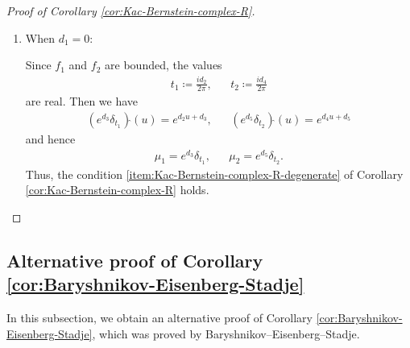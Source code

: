 \documentclass[12pt]{article}
\theoremstyle{definition}
\theoremstyle{remark}
\numberwithin{equation}{section}
\numberwithin{figure}{section}
\numberwithin{table}{section}
\begin{document}
\begin{proof}[Proof of Corollary \ref{cor:Kac-Bernstein-complex-R}]
\begin{enumerate}[label=(Case \arabic*)]
\item
When $ d_1 = 0 $:

Since $ f_1 $ and $ f_2 $ are bounded, the values
\begin{align}
    t_1 \coloneqq \frac{ i d_2 }{ 2 \pi }, & &
    t_2 \coloneqq \frac{ i d_4 }{ 2 \pi }
\end{align}
are real.
Then we have
\begin{align}
    ( e^{ d_3 } \delta_{ t_1 } )\hat{} ( u ) = e^{ d_2 u + d_3 }, & &
    ( e^{ d_5 } \delta_{ t_2 } )\hat{} ( u ) = e^{ d_4 u + d_5 }
\end{align}
and hence 
\begin{align}
    \mu_1 = e^{ d_3 } \delta_{ t_1 }, & &
    \mu_2 = e^{ d_5 } \delta_{ t_2 }.
\end{align}
Thus, the condition \ref{item:Kac-Bernstein-complex-R-degenerate} of Corollary \ref{cor:Kac-Bernstein-complex-R} holds.
\qedhere
\end{enumerate}

\end{proof}

\subsection{Alternative proof of Corollary \ref{cor:Baryshnikov-Eisenberg-Stadje}}
\label{subsec:Baryshnikov-Eisenberg-Stadje}

In this subsection, we obtain an alternative proof of Corollary \ref{cor:Baryshnikov-Eisenberg-Stadje}, which was proved by Baryshnikov--Eisenberg--Stadje.
\end{document}
